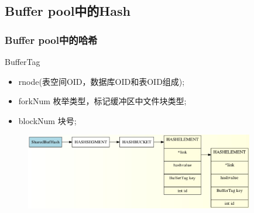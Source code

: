 \documentclass{beamer}
\makeatletter
\newcommand{\tabincell}[2]
{
	\begin{tabular}
	{@{}#1@{}}#2
	\end{tabular}
}
\makeatother
\begin{document}
\begin{CJK*}{UTF8}{gkai}
%
%



\section{Buffer pool中的Hash} 

\begin{frame}
\transdissolve
\frametitle{Buffer pool中的哈希}
\begin{exampleblock}{BufferTag}
\begin{itemize}
\item \quad rnode(表空间OID，数据库OID和表OID组成);\\
\item \quad forkNum 枚举类型，标记缓冲区中文件块类型;\\
\item \quad blockNum  块号;
\end{itemize}
\end{exampleblock}

\begin{figure}[!ht]
\centering
\includegraphics[width = 100mm]{buf.jpg}
\caption{}
\label{overflow}
\end{figure}
\end{frame}



\end{CJK*}
\end{document}
